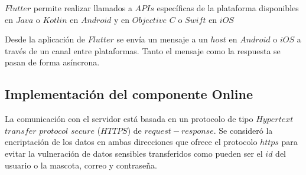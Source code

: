 $Flutter$ permite realizar llamados a $APIs$ específicas de la plataforma disponibles en $Java$ o $Kotlin$ en $Android$ y en $Objective$ $C$ o $Swift$ en $iOS$

Desde la aplicación de $Flutter$ se envía un mensaje a un $host$ en $Android$ o $iOS$ a través de un canal entre plataformas. Tanto el mensaje como la respuesta se pasan de forma asíncrona.

\subsection{Implementación del componente Online}
La comunicación con el servidor está basada en un protocolo de tipo $Hypertext$ $transfer$ $protocol$ $secure$ ($HTTPS$) de $request-response$. Se consideró la encriptación de los datos en ambas direcciones que ofrece el protocolo $https$ para evitar la vulneración de datos sensibles transferidos como pueden ser el $id$ del usuario o la mascota, correo y contraseña.


